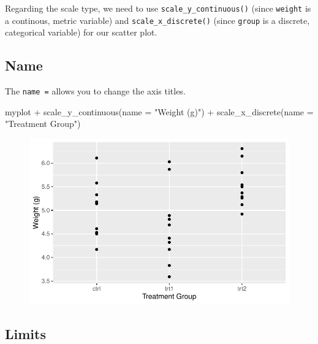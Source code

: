 \documentclass[
  letterpaper,
  DIV=11,
  numbers=noendperiod]{scrartcl}
\newenvironment{Shaded}{\begin{snugshade}}{\end{snugshade}}
\newcommand{\AttributeTok}[1]{\textcolor[rgb]{0.40,0.45,0.13}{#1}}
\newcommand{\FunctionTok}[1]{\textcolor[rgb]{0.28,0.35,0.67}{#1}}
\newcommand{\NormalTok}[1]{\textcolor[rgb]{0.00,0.23,0.31}{#1}}
\newcommand{\SpecialCharTok}[1]{\textcolor[rgb]{0.37,0.37,0.37}{#1}}
\newcommand{\StringTok}[1]{\textcolor[rgb]{0.13,0.47,0.30}{#1}}
\begin{document}
Regarding the scale type, we need to use \texttt{scale\_y\_continuous()}
(since \texttt{weight} is a continous, metric variable) and
\texttt{scale\_x\_discrete()} (since \texttt{group} is a discrete,
categorical variable) for our scatter plot.

\hypertarget{name}{%
\subsection{Name}\label{name}}

The \texttt{name\ =} allows you to change the axis titles.

\begin{Shaded}
\begin{Highlighting}[]
\NormalTok{myplot }\SpecialCharTok{+}
  \FunctionTok{scale\_y\_continuous}\NormalTok{(}\AttributeTok{name =} \StringTok{"Weight (g)"}\NormalTok{) }\SpecialCharTok{+}
  \FunctionTok{scale\_x\_discrete}\NormalTok{(}\AttributeTok{name =} \StringTok{"Treatment Group"}\NormalTok{)}
\end{Highlighting}
\end{Shaded}

\begin{figure}[H]

{\centering \includegraphics{ggplot2intro_files/figure-pdf/unnamed-chunk-7-1.pdf}

}

\end{figure}

\hypertarget{limits}{%
\subsection{Limits}\label{limits}}
\end{document}
